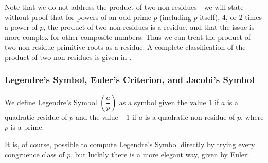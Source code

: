\documentclass{article}
\theoremstyle{plain}
\begin{document}
 \par Note that we do not address the product of two non-residues - we will state without proof that for powers of an odd prime $p$ (including $p$ itself), $4$, or $2$ times a power of $p$, the product of two non-residues is a residue, and that the issue is more complex for other composite numbers. Thus we can treat the product of two non-residue primitive roots as a residue. A complete classification of the product of two non-residues is given in \citep[Appendix 3]{riesel}.
 
 
\subsubsection*{Legendre's Symbol, Euler's Criterion, and Jacobi's Symbol}
We define Legendre's Symbol $\left( \dfrac{a}{p} \right)$ as a symbol given the value $1$ if $a$ is a quadratic residue of $p$ and the value $-1$ if $a$ is a quadratic non-residue of $p$, where $p$ is a prime.
\par It is, of course, possible to compute Legendre's Symbol directly by trying every congruence class of $p$, but luckily there is a more elegant way, given by Euler:
\end{document}

